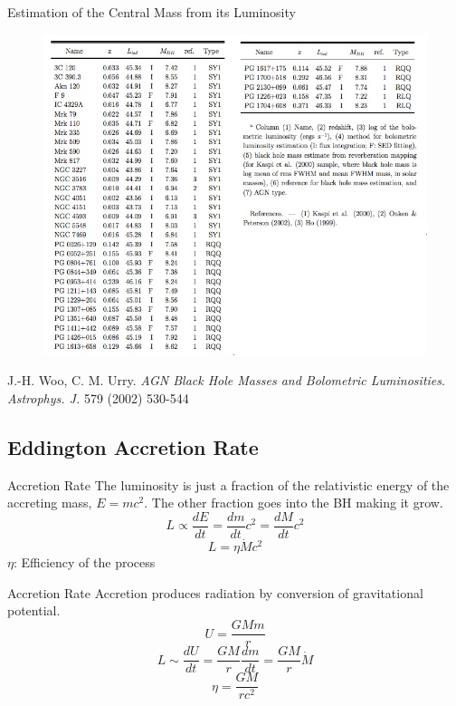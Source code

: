 \documentclass{beamer}
\begin{document}
\begin{frame}{Estimation of the Central Mass from its Luminosity}
	\begin{center}
      \begin{figure}
      	\includegraphics[scale=0.3] {figures/AGNs.jpg}
      \end{figure}
	\end{center}	
	\tiny
	J.-H. Woo, C. M. Urry. \textit{AGN Black Hole Masses and Bolometric Luminosities}. \textit{Astrophys. J.} 579 (2002) 530-544
\end{frame}

\subsection{Eddington Accretion Rate}
\begin{frame}{ Accretion Rate}
	The luminosity is just a fraction of the relativistic energy of the accreting mass, $E=m c^2$. The other fraction goes into the BH making it grow.
	\pause
	\[ L \propto \frac{dE}{dt} = \frac{dm}{dt} c^2 = \frac{dM}{dt} c^2 \]
	\pause
	\[L = \eta \dot{M} c^2\]
	\pause
	$\eta$: Efficiency of the process
\end{frame}


\begin{frame}{ Accretion Rate}
	Accretion produces radiation by conversion of gravitational potential.
	\[ U = \frac{GMm}{r}\]
	\pause
	\[ L \sim \frac{dU}{dt} = \frac{GM}{r} \frac{dm}{dt} = \frac{GM}{r} \dot{M} \]
	\pause
	\[\eta = \frac{GM}{rc^2}	\]	
\end{frame}
\end{document}
